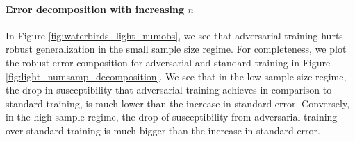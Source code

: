 \paragraph{Error decomposition with increasing $n$}

In Figure \ref{fig:waterbirds_light_numobs}, we see that adversarial training hurts robust generalization in the small sample size regime. For completeness, we plot the robust error composition for adversarial and standard training in Figure \ref{fig:light_numsamp_decomposition}. We see that in the low sample size regime, the drop in susceptibility that adversarial training achieves in comparison to standard training, is much lower than the increase in standard error. Conversely, in the high sample regime, the drop of susceptibility from adversarial training over standard training is much bigger than the increase in standard error. 

